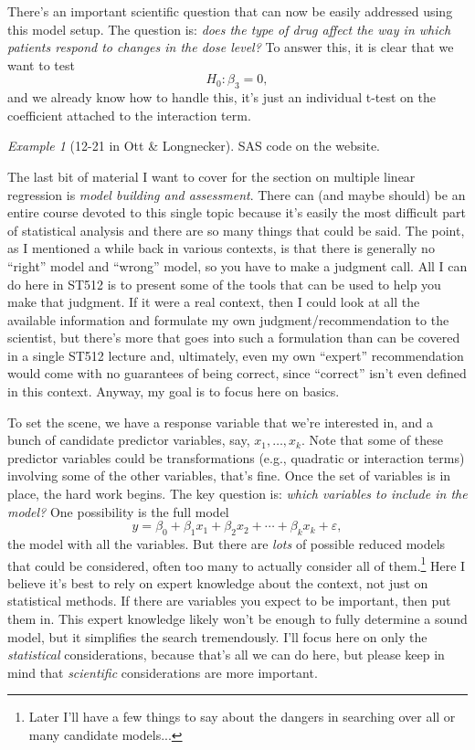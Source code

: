 \documentclass[a4paper, 12pt]{article}
\theoremstyle{plain}
\theoremstyle{definition}
\theoremstyle{remark}
\newtheorem*{example}{Example}
\newcommand{\eps}{\varepsilon}
\begin{document}
There's an important scientific question that can now be easily addressed using this model setup.  The question is: {\em does the type of drug affect the way in which patients respond to changes in the dose level?}  To answer this, it is clear that we want to test 
\[ H_0: \beta_3 = 0, \]
and we already know how to handle this, it's just an individual t-test on the coefficient attached to the interaction term.  

\begin{example}[12-21 in Ott \& Longnecker]
SAS code on the website.
\end{example}

The last bit of material I want to cover for the section on multiple linear regression is {\em model building and assessment}.  There can (and maybe should) be an entire course devoted to this single topic because it's easily the most difficult part of statistical analysis and there are so many things that could be said.  The point, as I mentioned a while back in various contexts, is that there is generally no ``right'' model and ``wrong'' model, so you have to make a judgment call.  All I can do here in ST512 is to present some of the tools that can be used to help you make that judgment.  If it were a real context, then I could look at all the available information and formulate my own judgment/recommendation to the scientist, but there's more that goes into such a formulation than can be covered in a single ST512 lecture and, ultimately, even my own ``expert'' recommendation would come with no guarantees of being correct, since ``correct'' isn't even defined in this context.  Anyway, my goal is to focus here on basics.  

To set the scene, we have a response variable that we're interested in, and a bunch of candidate predictor variables, say, $x_1,\ldots,x_k$.  Note that some of these predictor variables could be transformations (e.g., quadratic or interaction terms) involving some of the other variables, that's fine.  Once the set of variables is in place, the hard work begins.  The key question is: {\em which variables to include in the model?}  One possibility is the full model 
\[ y = \beta_0 + \beta_1 x_1 + \beta_2 x_2 + \cdots + \beta_k x_k + \eps, \]  
the model with all the variables.  But there are {\em lots} of possible reduced models that could be considered, often too many to actually consider all of them.\footnote{Later I'll have a few things to say about the dangers in searching over all or many candidate models...}  Here I believe it's best to rely on expert knowledge about the context, not just on statistical methods.  If there are variables you expect to be important, then put them in.  This expert knowledge likely won't be enough to fully determine a sound model, but it simplifies the search tremendously.  I'll focus here on only the {\em statistical} considerations, because that's all we can do here, but please keep in mind that {\em scientific} considerations are more important.  
\end{document}

